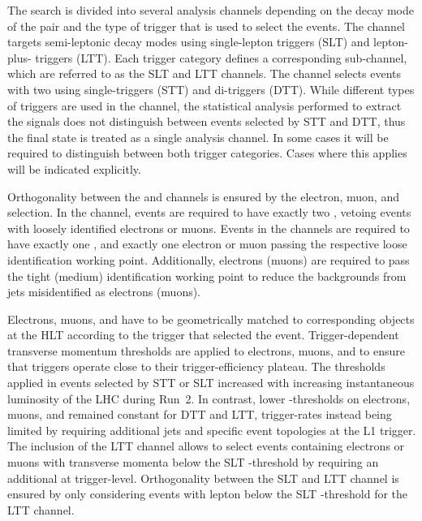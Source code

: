 The search is divided into several analysis channels depending on the
decay mode of the \taulepton pair and the type of trigger that is used
to select the events. The \lephad channel targets semi-leptonic decay
modes using single-lepton triggers (SLT) and lepton-plus-\tauhadvis
triggers (LTT). Each trigger category defines a corresponding
sub-channel, which are referred to as the \lephad SLT and \lephad LTT
channels. The \hadhad channel selects events with two \tauhadvis using
single-\tauhadvis triggers (STT) and di-\tauhadvis triggers
(DTT). While different types of triggers are used in the \hadhad
channel, the statistical analysis performed to extract the \HH signals
does not distinguish between events selected by STT and DTT, thus the
\hadhad final state is treated as a single analysis channel. In some
cases it will be required to distinguish between both trigger
categories. Cases where this applies will be indicated explicitly.

Orthogonality between the \lephad and \hadhad channels is ensured by
the electron, muon, and \tauhadvis selection. In the \hadhad channel,
events are required to have exactly two \tauhadvis, vetoing events
with loosely identified electrons or muons. Events in the \lephad
channels are required to have exactly one \tauhadvis, and exactly one
electron or muon passing the respective loose identification working
point. Additionally, electrons (muons) are required to pass the tight
(medium) identification working point to reduce the backgrounds from
jets misidentified as electrons (muons).

Electrons, muons, and \tauhadvis have to be geometrically matched to
corresponding objects at the HLT according to the trigger that
selected the event. Trigger-dependent transverse momentum thresholds
are applied to electrons, muons, and \tauhadvis to ensure that
triggers operate close to their trigger-efficiency plateau. The
thresholds applied in events selected by STT or SLT increased with
increasing instantaneous luminosity of the LHC during Run~2. In
contrast, lower \pT-thresholds on electrons, muons, and \tauhadvis
remained constant for DTT and LTT,
trigger-rates instead being limited by requiring additional jets and
specific event topologies at the L1 trigger. The inclusion of the
\lephad LTT channel allows to select events containing electrons or
muons with transverse momenta below the SLT \pT-threshold by requiring
an additional \tauhadvis at trigger-level. Orthogonality between the
\lephad SLT and LTT channel is ensured by only considering events with
lepton \pT below the SLT \pT-threshold for the LTT channel.

